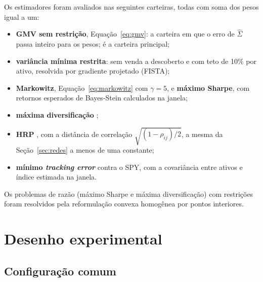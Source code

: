 Os estimadores foram avaliados nas seguintes carteiras, todas com soma dos pesos igual a um:
\begin{itemize}
  \item \textbf{GMV sem restrição}, Equação~\eqref{eq:gmv}: a carteira em que o erro de $\hat\Sigma$
        passa inteiro para os pesos; é a carteira principal;
  \item \textbf{variância mínima restrita}: sem venda a descoberto e com teto de 10\% por ativo,
        resolvida por gradiente projetado (FISTA);
  \item \textbf{Markowitz}, Equação~\eqref{eq:markowitz} com $\gamma=5$, e \textbf{máximo Sharpe}, com
        retornos esperados de Bayes-Stein \citep{jorion1986} calculados na janela;
  \item \textbf{máxima diversificação} \citep{choueifaty2008};
  \item \textbf{HRP} \citep{lopezdeprado2016}, com a distância de correlação $\sqrt{(1-\rho_{ij})/2}$, a
        mesma da Seção~\ref{sec:redes} a menos de uma constante;
  \item \textbf{mínimo \emph{tracking error}} contra o SPY, com a covariância entre ativos e índice
        estimada na janela.
\end{itemize}
Os problemas de razão (máximo Sharpe e máxima diversificação) com restrições foram resolvidos pela
reformulação convexa homogênea \citep{cornuejols2007} por pontos interiores.

\section{Desenho experimental}
\label{sec:desenho}

\subsection{Configuração comum}

